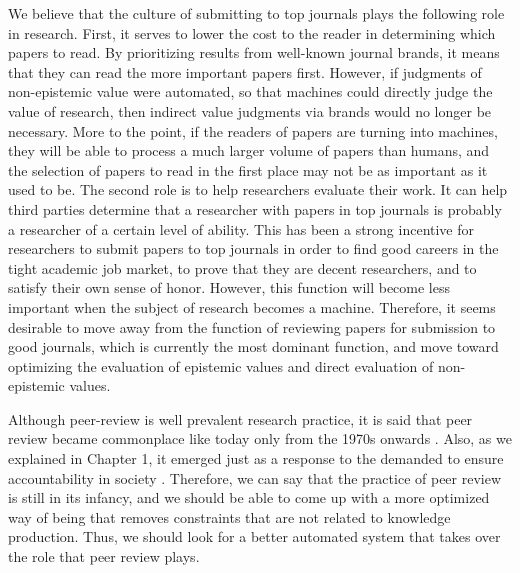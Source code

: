 \documentclass{book}
\begin{document}
We believe that the culture of submitting to top journals plays the following role in research. First, it serves to lower the cost to the reader in determining which papers to read. By prioritizing results from well-known journal brands, it means that they can read the more important papers first. However, if judgments of non-epistemic value were automated, so that machines could directly judge the value of research, then indirect value judgments via brands would no longer be necessary. More to the point, if the readers of papers are turning into machines, they will be able to process a much larger volume of papers than humans, and the selection of papers to read in the first place may not be as important as it used to be. The second role is to help researchers evaluate their work. It can help third parties determine that a researcher with papers in top journals is probably a researcher of a certain level of ability. This has been a strong incentive for researchers to submit papers to top journals in order to find good careers in the tight academic job market, to prove that they are decent researchers, and to satisfy their own sense of honor. However, this function will become less important when the subject of research becomes a machine. Therefore, it seems desirable to move away from the function of reviewing papers for submission to good journals, which is currently the most dominant function, and move toward optimizing the evaluation of epistemic values and direct evaluation of non-epistemic values.

Although peer-review is well prevalent research practice, it is said that peer review became commonplace like today only from the 1970s onwards \cite{baldwin2018scientific}. Also, as we explained in Chapter 1, it emerged just as a response to the demanded to ensure accountability in society \cite{baldwin2018scientific}. Therefore, we can say that the practice of peer review is still in its infancy, and we should be able to come up with a more optimized way of being that removes constraints that are not related to knowledge production. Thus, we should look for a better automated system that takes over the role that peer review plays.


\end{document}

